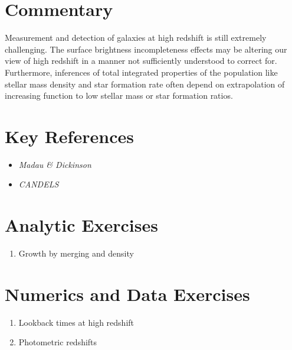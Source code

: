 \section{Commentary}

Measurement and detection of galaxies at high redshift is still
extremely challenging. The surface brightness incompleteness effects
may be altering our view of high redshift in a manner not sufficiently
understood to correct for. Furthermore, inferences of total integrated
properties of the population like stellar mass density and star
formation rate often depend on extrapolation of increasing function to
low stellar mass or star formation ratios.

\section{Key References}

\begin{itemize}
  \item
    {\it Madau \& Dickinson}
  \item
    {\it CANDELS}
\end{itemize}

\citet{gunn06a}

%

\section{Analytic Exercises}

\begin{enumerate}
\item Growth by merging and density
\end{enumerate}

\section{Numerics and Data Exercises}

\begin{enumerate}
\item Lookback times at high redshift
\item Photometric redshifts
\end{enumerate}


  
